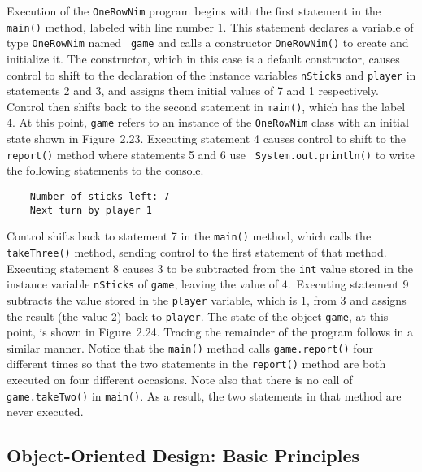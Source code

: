 Execution of the {\tt OneRowNim} program begins with the first
statement in the {\tt main()} method, labeled with line number 1.
This statement declares a variable of type {\tt OneRowNim} named {\tt
game} and calls a constructor {\tt OneRowNim()} to create and
initialize it.  The constructor, which in this case is a default
constructor, causes control to shift to the declaration of the
instance variables {\tt nSticks} and {\tt player} in statements 2 and
3, and assigns them initial values of 7 and 1 respectively.  Control
then shifts back to the second statement in {\tt main()}, which has
the label 4.  At this point, {\tt game} refers to an instance of the
{\tt OneRowNim} class with an initial state shown in
Figure~2.23.  Executing statement 4 causes control to
shift to the {\tt report()} method where statements 5 and 6 use {\tt
System.out.println()} to write the following statements to the
console.

\begin{jjjlisting}
\begin{lstlisting}
    Number of sticks left: 7
    Next turn by player 1
\end{lstlisting}
\end{jjjlisting}

\noindent Control shifts back to statement 7 in the {\tt main()} method, 
which calls the {\tt takeThree()} method, sending control to the first
statement of that method.  Executing statement 8 causes $3$ to be
subtracted from the {\tt int} value stored in the instance variable
{\tt nSticks} of {\tt game}, leaving the value of $4$.\ Executing
statement 9 subtracts the value stored in the {\tt player} variable,
which is $1$, from $3$ and assigns the result (the value $2$) back to
{\tt player}.  The state of the object {\tt game}, at this point, is
shown in Figure~2.24.
Tracing the remainder of the program follows in a similar manner.
Notice that the {\tt main()} method calls {\tt game.report()} four
different times so that the two statements in the {\tt report()}
method are both executed on four different occasions.  Note also that
there is no call of {\tt game.takeTwo()} in {\tt main()}. As a result,
the two statements in that method are never executed.

\subsection{Object-Oriented Design: Basic Principles}

